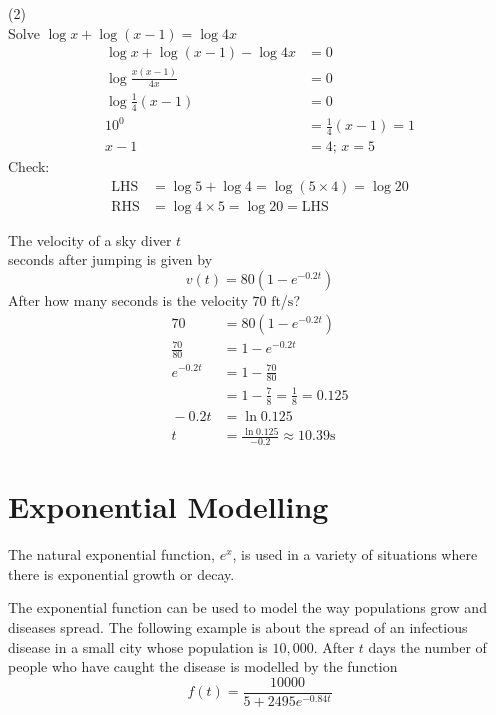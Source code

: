 \begin{tasks}[label-width={6em}](2)
	\task[Example 3]\\
Solve $\log  x +\log  \left (x -1\right ) =\log  4 x$\\ \solution
\begin{align*}\log  x +\log  \left (x -1\right ) -\log  4 x &  = 0 \\
\log  \frac{x \left (x -1\right )}{4 x} &  = 0 \\
\log  \frac{1}{4} \left (x -1\right ) &  = 0 \\
\text{}10^{0} &  = \frac{1}{4} \left (x -1\right ) =1 \\
x -1 &  = 4;\, x=5\end{align*}
Check:
\begin{align*}\text{LHS} &  = \log  5 +\log  4 =\log  \left (5 \times 4\right ) =\log  20 \\
\text{RHS} &  = \log  4 \times 5 =\log  20 =\text{LHS}\end{align*}

\task[Example 4] The velocity of a sky diver $t$ \\seconds after jumping is given by
\begin{equation*}v \left (t\right ) =80 \left (1 -e^{ -0.2 t}\right )
\end{equation*}
After how many seconds is the velocity $70$ $\mbox{ft}$/$\mbox{s}$?\solution
\begin{align*}70 &  = 80 \left (1 -e^{ -0.2 t}\right ) \\
\frac{70}{80} &  = 1 -e^{ -0.2 t} \\
e^{ -0.2 t} &  = 1 -\frac{70}{80} \\
&  = 1 -\frac{7}{8} =\frac{1}{8} =0.125 \\
\text{} -0.2 t &  = \ln  0.125 \\
t &  = \frac{\ln  0.125}{ -0.2} \approx 10.39\text{}\mbox{s}\end{align*}
\end{tasks}

\section{Exponential Modelling}
The natural exponential function, $e^x$, is used in a variety of situations where there is exponential growth or decay. 

\example The exponential function can be used to model the way populations grow and diseases spread. The following
example is about the spread of an infectious disease in a small city whose population is $10,000$. After $t$ days the number of people who have caught the disease is modelled by the function
\begin{equation*}f (t) =\frac{10000}{5 +2495 e^{ -0.84 t}}
\end{equation*}


